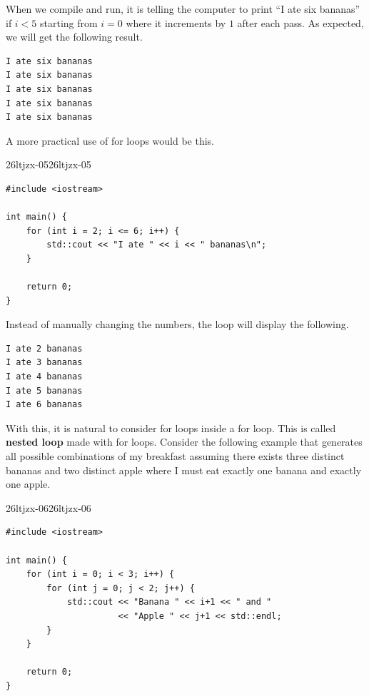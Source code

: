 \documentclass[../../../main.tex]{subfiles}
\begin{document}
When we compile and run, it is telling the computer to print
``I ate six bananas'' if $i < 5$ starting from $i = 0$ where it
increments by $1$ after each pass. As expected, we will get the
following result.

\begin{outputbox}
\begin{lstlisting}[style=basic]
I ate six bananas
I ate six bananas
I ate six bananas
I ate six bananas
I ate six bananas
\end{lstlisting}
\end{outputbox}

A more practical use of for loops would be this.

\begin{cppbox}{26ltjzx-05}{26ltjzx-05}
\begin{lstlisting}[style=cppstyle]
#include <iostream>

int main() {
    for (int i = 2; i <= 6; i++) {
        std::cout << "I ate " << i << " bananas\n";
    }

    return 0;
}
\end{lstlisting}
\end{cppbox}

Instead of manually changing the numbers, the loop will display
the following.

\begin{outputbox}
\begin{lstlisting}[style=basic]
I ate 2 bananas
I ate 3 bananas
I ate 4 bananas
I ate 5 bananas
I ate 6 bananas
\end{lstlisting}
\end{outputbox}

With this, it is natural to consider for loops inside a for loop.
This is called \textbf{nested loop} made with for loops. Consider
the following example that generates all possible combinations of
my breakfast assuming there exists three distinct bananas and
two distinct apple where I must eat exactly one banana and exactly
one apple.

\begin{cppbox}{26ltjzx-06}{26ltjzx-06}
\begin{lstlisting}[style=cppstyle]
#include <iostream>

int main() {
    for (int i = 0; i < 3; i++) {
        for (int j = 0; j < 2; j++) {
            std::cout << "Banana " << i+1 << " and "
                      << "Apple " << j+1 << std::endl;
        }
    }

    return 0;
}
\end{lstlisting}
\end{cppbox}
\end{document}
